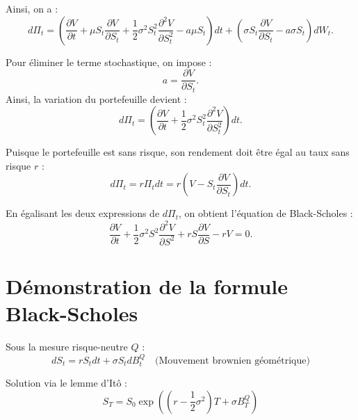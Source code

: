 Ainsi, on a :
\begin{equation}
    d\Pi_t = \left( \frac{\partial V}{\partial t} + \mu S_t \frac{\partial V}{\partial S_t} + \frac{1}{2} \sigma^2 S_t^2 \frac{\partial^2 V}{\partial S_t^2} - a \mu S_t \right) dt + \left( \sigma S_t \frac{\partial V}{\partial S_t} - a \sigma S_t \right) dW_t.
\end{equation}

Pour éliminer le terme stochastique, on impose :
\begin{equation}
    a = \frac{\partial V}{\partial S_t}.
\end{equation}
Ainsi, la variation du portefeuille devient :
\begin{equation}
    d\Pi_t = \left( \frac{\partial V}{\partial t} + \frac{1}{2} \sigma^2 S_t^2 \frac{\partial^2 V}{\partial S_t^2} \right) dt.
\end{equation}

Puisque le portefeuille est sans risque, son rendement doit être égal au taux sans risque $r$ :
\begin{equation}
    d\Pi_t = r \Pi_t dt = r \left(V - S_t \frac{\partial V}{\partial S_t} \right) dt.
\end{equation}

En égalisant les deux expressions de $d\Pi_t$, on obtient l'équation de Black-Scholes :
\begin{equation}
    \frac{\partial V}{\partial t} + \frac{1}{2} \sigma^2 S^2 \frac{\partial^2 V}{\partial S^2} + r S \frac{\partial V}{\partial S} - rV = 0.
\end{equation}



\section{Démonstration de la formule Black-Scholes}
\label{app:BS closedForm}

Sous la mesure risque-neutre \( Q \) :
\begin{equation}
    dS_t = rS_t dt + \sigma S_t dB_t^Q \quad \text{(Mouvement brownien géométrique)}
\end{equation}

Solution via le lemme d'Itô :
\begin{equation}
    S_T = S_0 \exp\left(\left(r - \frac{1}{2}\sigma^2\right)T + \sigma B_T^Q\right)
\end{equation}


